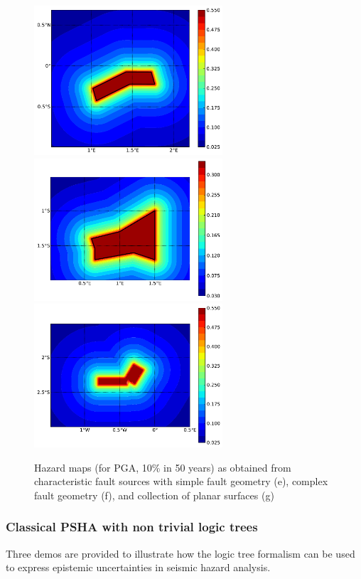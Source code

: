 \begin{figure} 
\centering 
\subcaptionbox{}
{\includegraphics[width=7cm]{figures/hazard/char_fault2.pdf}} 
\subcaptionbox{}
{\includegraphics[width=7cm]{figures/hazard/char_fault3.pdf}} 
\subcaptionbox{}
{\includegraphics[width=7cm]{figures/hazard/char_fault1.pdf}} 
\caption{Hazard maps (for PGA, 10\% in 50 years) as obtained from 
    characteristic fault sources with simple fault
    geometry (e), complex fault geometry (f), and collection of 
    planar surfaces (g)}
\label{fig:hazard_maps2}
\end{figure}

\clearpage
\subsubsection{Classical PSHA with non trivial logic trees}
Three demos are provided to illustrate how the logic tree formalism can 
be used to express epistemic uncertainties in seismic hazard analysis.\\


